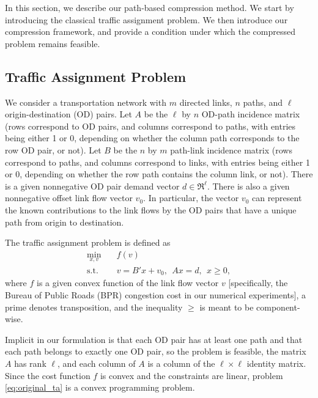 \documentclass[11pt]{article}
\begin{document}
In this section, we describe our path-based compression method. We start by introducing the classical traffic assignment problem. We then introduce our compression framework, and provide a condition under which the compressed problem remains feasible.






\subsection{Traffic Assignment Problem}
We consider a transportation network with $m$ directed links, $n$ paths, and $\ell$ origin-destination (OD) pairs. Let $A$ be the $\ell$ by $n$ OD-path incidence matrix (rows correspond to OD pairs, and  columns correspond to paths, with entries being either 1 or 0, depending on whether the column path corresponds to  the row OD pair, or not). Let $B$ be the $n$ by $m$ path-link incidence matrix (rows correspond to paths, and  columns correspond to links, with entries being either 1 or 0, depending on whether  the row path contains the column link, or not). There is a given nonnegative OD pair demand vector $d\in \Re^\ell$. There is also a given nonnegative offset link flow vector $v_0$. In particular, the vector $v_0$ can represent the known contributions to the link flows by the OD pairs that have a unique path from origin to destination. 



The traffic assignment problem is defined as
\begin{equation}
    \label{eq:original_ta}
    \begin{aligned}
        \min_{x,v}\quad & f(v)\\
    \text{s.t.}\quad &v=B'x+v_0,\ \ Ax=d, \ \ x\geq 0,
    \end{aligned}
\end{equation}
where $f$ is a given convex function of the link flow vector $v$ [specifically, the Bureau of Public Roads (BPR) congestion cost in our numerical experiments], a prime denotes transposition, and the inequality $\geq$ is meant to be component-wise. 

Implicit in our formulation is that each OD pair has at least one path and that each path belongs to exactly one OD pair, so the problem is feasible, the matrix $A$ has rank $\ell$, and each column of $A$ is a column of the $\ell\times \ell$ identity matrix.    
Since the cost function $f$ is convex and the constraints are linear, problem \eqref{eq:original_ta} is a convex programming problem.
\end{document}
